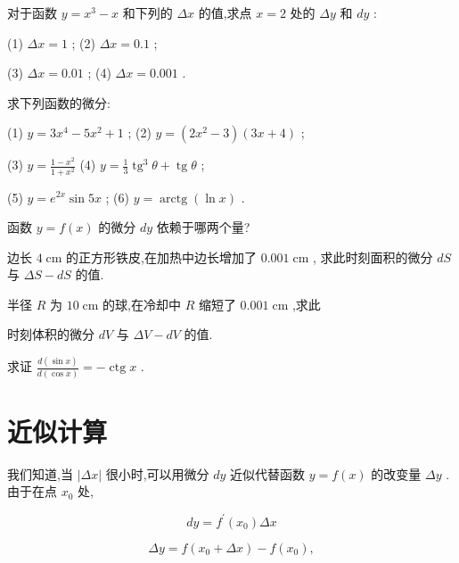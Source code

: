 \documentclass[lang=cn,newtx,12pt,scheme=chinese]{elegantbook}
\begin{document}
\begin{problemset}[练习]

\item 对于函数 \(y = {x}^{3} - x\) 和下列的 \({\Delta x}\) 的值,求点 \(x = 2\) 处的 \({\Delta y}\) 和 \({dy}\) :

(1) \({\Delta x} = 1\) ; (2) \({\Delta x} = {0.1}\) ;

(3) \({\Delta x} = {0.01}\) ; (4) \({\Delta x} = {0.001}\) .

\item 求下列函数的微分:

(1) \(y = 3{x}^{4} - 5{x}^{2} + 1\) ; (2) \(y = \left( {2{x}^{2} - 3}\right) \left( {{3x} + 4}\right)\) ;

(3) \(y = \frac{1 - {x}^{2}}{1 + {x}^{2}}\) (4) \(y = \frac{1}{3}{\operatorname{tg}}^{3}\theta + \operatorname{tg}\theta\) ;

(5) \(y = {e}^{2x}\sin {5x}\) ; (6) \(y = \operatorname{arctg}\left( {\ln x}\right)\) .

\item 函数 \(y = f\left( x\right)\) 的微分 \({dy}\) 依赖于哪两个量?

\item 边长 \(4\mathrm{\;{cm}}\) 的正方形铁皮,在加热中边长增加了 \({0.001}\mathrm{\;{cm}}\) , 求此时刻面积的微分 \({dS}\) 与 \({\Delta S} - {dS}\) 的值.

\item 半径 \(R\) 为 \({10}\mathrm{\;{cm}}\) 的球,在冷却中 \(R\) 缩短了 \({0.001}\mathrm{\;{cm}}\) ,求此

时刻体积的微分 \({dV}\) 与 \({\Delta V} - {dV}\) 的值.

\item 求证 \(\frac{d\left( {\sin x}\right) }{d\left( {\cos x}\right) } = - \operatorname{ctg}x\) .

\end{problemset}

\section{近似计算}

我们知道,当 \(\left| {\Delta x}\right|\) 很小时,可以用微分 \({dy}\) 近似代替函数 \(y = f\left( x\right)\) 的改变量 \({\Delta y}\) . 由于在点 \({x}_{0}\) 处,

\[
{dy} = {f}^{\prime }\left( {x}_{0}\right) {\Delta x}
\]

\[
{\Delta y} = f\left( {{x}_{0} + {\Delta x}}\right) - f\left( {x}_{0}\right) ,
\]
\end{document}
